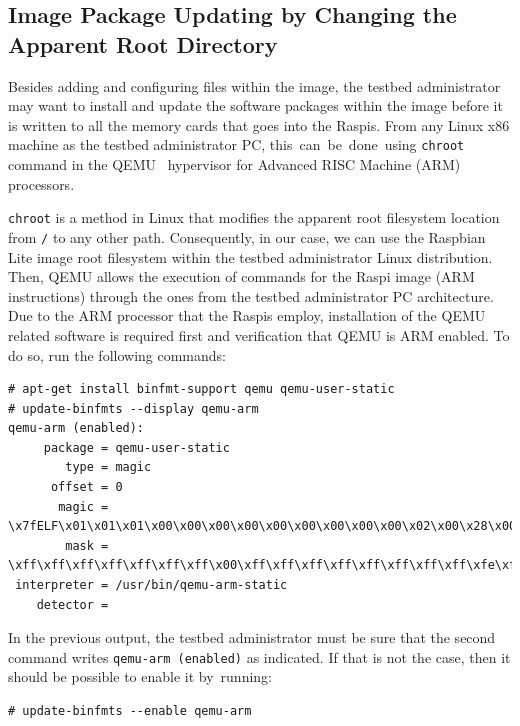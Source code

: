 \documentclass[electronics,article,accept,moreauthors,pdftex,10pt,a4paper]{mdpi}
\theoremstyle{mdpi}
\newcounter{ex}
\newcounter{re}
\theoremstyle{mdpidefinition}
\begin{document}
\subsection{Image Package Updating by Changing the Apparent Root Directory}
Besides adding and configuring files within the image, the testbed
administrator may want to install and update the software packages
within the image before it is written to all the memory cards that goes
into the Raspis. From any Linux x86 machine as the testbed administrator
PC, \mbox{this can be done using} \texttt{chroot} command in the
\ac{QEMU}~\cite{QemuUserEmulation} hypervisor for Advanced RISC Machine (ARM) processors.

\texttt{chroot} is a method in Linux that modifies the apparent root
filesystem location from \texttt{/} to any other path. Consequently, in
our case, we can use the Raspbian Lite image root filesystem within the
testbed administrator Linux distribution. Then, \ac{QEMU} allows the execution
of commands for the Raspi image (ARM instructions) through the ones
from the testbed administrator PC architecture. Due to the ARM
processor that the Raspis employ, installation of the \ac{QEMU} related software is required first and verification that \ac{QEMU} is ARM enabled. To do so,
run the following commands:
\newpage

\begin{lstlisting}[]
# apt-get install binfmt-support qemu qemu-user-static
# update-binfmts --display qemu-arm
qemu-arm (enabled):
     package = qemu-user-static
        type = magic
      offset = 0
       magic = \x7fELF\x01\x01\x01\x00\x00\x00\x00\x00\x00\x00\x00\x00\x02\x00\x28\x00
        mask = \xff\xff\xff\xff\xff\xff\xff\x00\xff\xff\xff\xff\xff\xff\xff\xff\xfe\xff\xff\xff
 interpreter = /usr/bin/qemu-arm-static
    detector =
\end{lstlisting}
\FloatBarrier
\vspace{-5mm}

In the previous output, the testbed administrator must be sure that the second
command writes \texttt{qemu-arm (enabled)} as indicated. If that is not the
case, then it should be possible to enable it by~running:

\begin{lstlisting}[]
# update-binfmts --enable qemu-arm
\end{lstlisting}
\FloatBarrier
\vspace{-5mm}
\end{document}
